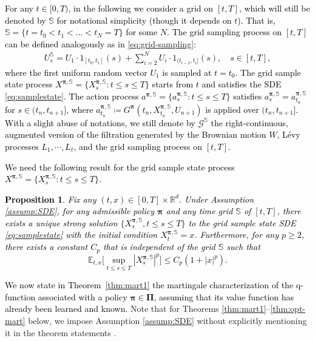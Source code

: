 \documentclass[11pt]{article}
\newtheorem{proposition}{Proposition}
\newcommand{\1}{\mathbbm{1}}
\newcommand{\bpi}{\boldsymbol{\pi}}
\newcommand{\rev}[1]{\textcolor{black}{{#1}}} %
\newcommand{\gao}[1]{\textcolor{black}{{#1}}}
\begin{document}
\rev{For any $t \in [0, T)$, in the following we consider a grid on $[t, T]$, which will still be denoted by $\mathbb{S}$ for notational simplicity (though it depends on $t$). That is, $\mathbb{S}= \{t = t_0 < t_1 < \ldots < t_N = T\}$ for some $N$.
The grid sampling process on $[t, T]$ can be defined analogously as in \eqref{eq:grid-sampling}:
\begin{align} \label{eq:grid-sampling-t}
U_s^{\mathbb{S}} = U_1  \cdot 1_{[t_0, t_1]}(s) + \sum_{i=2}^N U_i \cdot 1_{(t_{i-1}, t_i]}(s), \quad s \in [t,T],
\end{align}
where the first uniform random vector $U_1$ is sampled at $t = t_0.$
The grid sample state process $X^{\boldsymbol{\pi, \mathbb{S} }} = \{X^{\boldsymbol{\pi, \mathbb{S}}}_s: t \le s \le T\}$ starts from $t$ and satisfies the SDE \eqref{eq:samplestate}. The action process $a^{\boldsymbol{\pi, \mathbb{S} }} = \{a^{\boldsymbol{\pi, \mathbb{S}}}_s: t \le s \le T\}$ satisfies $a^{\bpi,\mathbb{S}}_{s}=a_{t_n}^{\bpi,\mathbb{S}}$ for $s \in (t_n,t_{n+1}]$, where $a_{t_n}^{\bpi,\mathbb{S}}\coloneqq G^{\bpi}(t_n, X^{\bpi, \mathbb{S}}_{t_n}, U_{n+1})$ is applied over $(t_n,t_{n+1}]$.
With a slight abuse of notations,
we still denote by $\mathcal{G}^{\mathbb{S}}$ the right-continuous, augmented version of the filtration generated by the Brownian motion $W$,  L\'evy processes $L_1,\cdots,L_{\ell}$, and the grid sampling process on $[t, T]$. }



\gao{We need the following result for the grid sample state process $X^{\boldsymbol{\pi, \mathbb{S} }} = \{X^{\boldsymbol{\pi, \mathbb{S}}}_s: t \le s \le T\}$.
\begin{proposition} \label{prop:SDE-sampled}
	Fix any $(t,x)\in[0,T]\times\mathbb{R}^d$. Under Assumption \ref{assump:SDE}, for any admissible policy $\bpi$ and any time grid $\mathbb{S}$ of $[t, T]$, there exists a unique strong solution $\{{X}_s^{\bpi, \mathbb{S}}, t \leq s\leq T\}$ to the grid sample state SDE \eqref{eq:samplestate} with the initial condition ${X}_t^{\bpi, \mathbb{S}}=x$. Furthermore, for any $p\geq 2$, there exists a constant $C_p$ that is independent of the grid $\mathbb{S}$ such that
	\begin{equation}\label{eq:moment-grid}
		\mathbb{E}_{t,x}\Big[\sup_{t \le s\le T}|X_s^{\bpi, \mathbb{S}}|^p\Big] \le C_p(1+|x|^{p}).
	\end{equation}
\end{proposition} }

\rev{We now state in Theorem~\ref{thm:mart1} the martingale characterization of the q-function associated with a policy $\boldsymbol{\pi} \in \boldsymbol{\Pi}$, assuming that its value function has already been learned and known.} Note that for Theorems \ref{thm:mart1}--\ref{thm:opt-mart} below, we impose Assumption \ref{assump:SDE} without explicitly mentioning it in the theorem statements .
\end{document}
